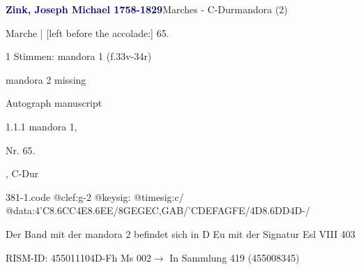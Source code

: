 \documentclass[twocolumn, 12pt]{book}
\begin{document}
\par \vspace{16pt} \textcolor{darkblue}{\textbf{Zink, Joseph Michael  1758-1829}}\hfillplus{\textbf{[381]}}\newline Marches - C-Dur\newline mandora (2)
\par \begin{itshape}[f.33v, at left:] Marche | [left before the accolade:] 65.\end{itshape} 
\par \textcolor{darkblue}{}  1 Stimmen: mandora 1  (f.33v-34r)\newline \begin{small} mandora 2 missing\end{small} \newline Autograph manuscript
\par 1.1.1  mandora 1, \begin{itshape}Nr. 65.\end{itshape}, C-Dur  
\begin{filecontents*}{381-1.code}
@clef:g-2
@keysig:
@timesig:c/
@data:4'C{8.6CC}4E{8.6EE}/{8GEGE}{C,GAB}/{'CDEF}{AGFE}/4D{8.6DD}4D-/
\end{filecontents*}
\newline %
\par Der Band mit der mandora 2 befindet sich in D Eu mit der Signatur Esl VIII 403
\par RISM-ID: 455011104\newline D-Fh  Ms 002\newline $\rightarrow$ In Sammlung 419 (455008345)
      
\end{document}
